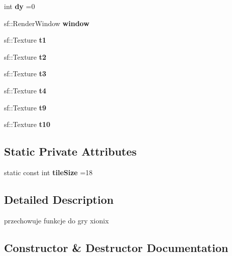 \begin{DoxyCompactItemize}
\item 
\mbox{\label{class_xionix_a66ec8c7ce745d05efb1de2b727159fd1}} 
int {\bfseries dy} =0
\item 
\mbox{\label{class_xionix_a9b9a777f4ed1c67fca0e754e7ab9004c}} 
sf\+::\+Render\+Window {\bfseries window}
\item 
\mbox{\label{class_xionix_a80b907ff934310aebaf4e9673cc01b04}} 
sf\+::\+Texture {\bfseries t1}
\item 
\mbox{\label{class_xionix_a9b3634e390377ecb4dde5fd1a2f199ae}} 
sf\+::\+Texture {\bfseries t2}
\item 
\mbox{\label{class_xionix_ac7f5f98f6e5a98ea71d301fc26512021}} 
sf\+::\+Texture {\bfseries t3}
\item 
\mbox{\label{class_xionix_a2ec92b3ad41187141c5d7a02359f293b}} 
sf\+::\+Texture {\bfseries t4}
\item 
\mbox{\label{class_xionix_aa51e605a6730a7ac41b6009392d316ae}} 
sf\+::\+Texture {\bfseries t9}
\item 
\mbox{\label{class_xionix_a6e4b7d89d8bff01aca7393d5d610a2dc}} 
sf\+::\+Texture {\bfseries t10}
\end{DoxyCompactItemize}
\subsection*{Static Private Attributes}
\begin{DoxyCompactItemize}
\item 
\mbox{\label{class_xionix_ae0c786311a41d7394550f9c24592d6f2}} 
static const int {\bfseries tile\+Size} =18
\end{DoxyCompactItemize}


\subsection{Detailed Description}
przechowuje funkcje do gry xionix 

\subsection{Constructor \& Destructor Documentation}
\mbox{\label{class_xionix_a19949767d2f31e6a1e4eb5c0e86ecb62}} 
